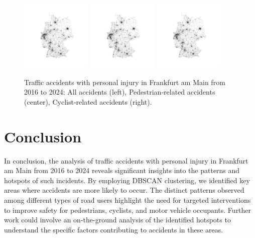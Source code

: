 \documentclass[10pt,a4paper]{article} %
\begin{document}
\begin{figure}[h!]
    \centering
    \includegraphics[width=0.3\textwidth]{../src/img/de-2024-bw.png}
    \includegraphics[width=0.3\textwidth]{../src/img/de-2024-bw.png}
    \includegraphics[width=0.3\textwidth]{../src/img/de-2024-bw.png}
    \caption{Traffic accidents with personal injury in Frankfurt am Main from 2016 to 2024: All accidents (left), Pedestrian-related accidents (center), Cyclist-related accidents (right).}
\end{figure}

\section*{Conclusion}
In conclusion, the analysis of traffic accidents with personal injury in Frankfurt am Main from 2016 to 2024 reveals significant insights into the patterns and hotspots of such incidents. By employing DBSCAN clustering, we identified key areas where accidents are more likely to occur. The distinct patterns observed among different types of road users highlight the need for targeted interventions to improve safety for pedestrians, cyclists, and motor vehicle occupants. Further work could involve an on-the-ground analysis of the identified hotspots to understand the specific factors contributing to accidents in these areas.
\end{document}
